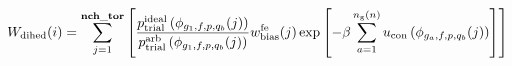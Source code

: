 \documentclass[12pt]{article}
\begin{document}
\begin{displaymath}
W_{\rm dihed}(i) =
\sum_{j=1}^{\bf nch\_tor}
\left[
{
{{p_{\rm trial}^{\rm ideal}\left(\phi_{g_1,f,p,q_b}(j)\right)}\over{ p_{\rm trial}^{\rm arb}\left(\phi_{g_1,f,p,q_b}(j)\right)}}
w_{\rm bias}^{\rm fe}(j)
\exp\left[-\beta \sum_{a=1}^{n_{\rm g}(n)} u_{\rm con}\left(\phi_{g_a,f,p,q_b}(j)\right)\right]
}
\right]
\end{displaymath}
\end{document}
